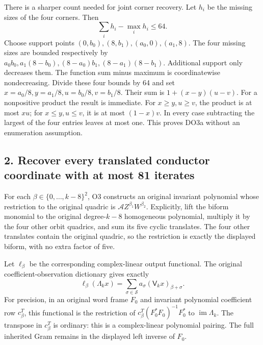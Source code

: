 \documentclass[11pt]{article}
\begin{document}
There is a sharper count needed for joint corner recovery. Let \(h_i\) be the missing sizes of the four corners. Then \[
\boxed{\sum_i h_i-\max_i h_i\le64.}\tag{DO3a}
\] Choose support points \((0,b_0),(8,b_1),(a_0,0),(a_1,8)\). The four missing sizes are bounded respectively by \(a_0b_0,a_1(8-b_0),(8-a_0)b_1,(8-a_1)(8-b_1)\). Additional support only decreases them. The function sum minus maximum is coordinatewise nondecreasing. Divide these four bounds by 64 and set \(x=a_0/8,y=a_1/8,u=b_0/8,v=b_1/8\). Their sum is \(1+(x-y)(u-v)\). For a nonpositive product the result is immediate. For \(x\ge y,u\ge v\), the product is at most \(xu\); for \(x\le y,u\le v\), it is at most \((1-x)v\). In every case subtracting the largest of the four entries leaves at most one. This proves DO3a without an enumeration assumption.

\subsection{2. Recover every translated conductor coordinate with at most 81 iterates}\label{pdepth:recover-every-translated-conductor-coordinate-with-at-most-81-iterates}

For each \(\beta\in\{0,\ldots,k-8\}^2\), O3 constructs an original invariant polynomial whose restriction to the original quadric is \(\mathcal A Z^{\beta_1}W^{\beta_2}\). Explicitly, lift the biform monomial to the original degree-\(k-8\) homogeneous polynomial, multiply it by the four other orbit quadrics, and sum its five cyclic translates. The four other translates contain the original quadric, so the restriction is exactly the displayed biform, with no extra factor of five.

Let \(\ell_\beta\) be the corresponding complex-linear output functional. The original coefficient-observation dictionary gives exactly \[
\ell_\beta(\Lambda_k x)=
\sum_{\sigma\in\mathcal S}a_\sigma
(\mathsf V_kx)_{\beta+\sigma}.
\tag{DO4}
\] For precision, in an original word frame \(F_0\) and invariant polynomial coefficient row \(c_\beta^T\), this functional is the restriction of \(c_\beta^T(F_0^*F_0)^{-1}F_0^*\) to \(\operatorname{im}\Lambda_k\). The transpose in \(c_\beta^T\) is ordinary: this is a complex-linear polynomial pairing. The full inherited Gram remains in the displayed left inverse of \(F_0\).
\end{document}
